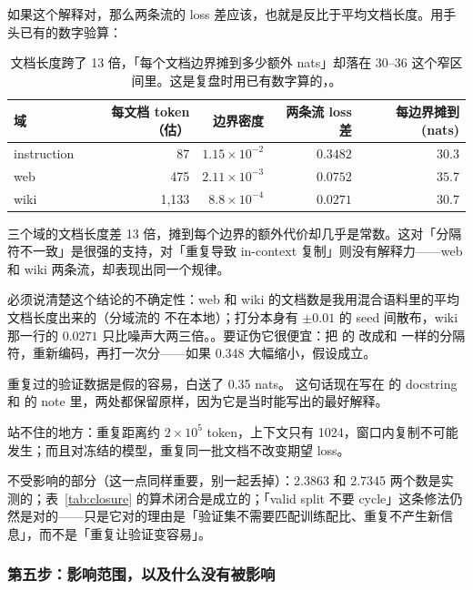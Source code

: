 如果这个解释对，那么两条流的 loss 差应该，也就是反比于平均文档长度。用手头已有的数字验算：

\begin{table}[t]
\centering
\begin{tabular}{lrrrr}
\toprule
域 & 每文档 token（估） & 边界密度 & 两条流 loss 差 & 每边界摊到 (nats) \\
\midrule
instruction & 87      & $1.15\times10^{-2}$ & $0.3482$ & $30.3$ \\
web         & 475     & $2.11\times10^{-3}$ & $0.0752$ & $35.7$ \\
wiki        & 1{,}133 & $8.8\times10^{-4}$  & $0.0271$ & $30.7$ \\
\bottomrule
\end{tabular}
\caption{文档长度跨了 13 倍，「每个文档边界摊到多少额外 nats」却落在 30--36 这个窄区间里。这是复盘时用已有数字算的，。}
\label{tab:boundary-cost}
\end{table}

三个域的文档长度差 13 倍，摊到每个边界的额外代价却几乎是常数。这对「分隔符不一致」是很强的支持，对「重复导致 in-context 复制」则没有解释力——web 和 wiki 两条流，却表现出同一个规律。

必须说清楚这个结论的不确定性：web 和 wiki 的文档数是我用混合语料里的平均文档长度出来的（分域流的  不在本地）；打分本身有 $\pm0.01$ 的 seed 间散布，wiki 那一行的 $0.0271$ 只比噪声大两三倍。。要证伪它很便宜：把  的  改成和  一样的分隔符，重新编码，再打一次分——如果 0.348 大幅缩小，假设成立。

\begin{retraction}{重复过的验证数据是假的容易，白送了 0.35 nats。}
这句话现在写在  的 docstring 和  的 note 里，两处都保留原样，因为它是当时能写出的最好解释。

站不住的地方：重复距离约 $2\times10^{5}$ token，上下文只有 1024，窗口内复制不可能发生；而且对冻结的模型，重复同一批文档不改变期望 loss。

不受影响的部分（这一点同样重要，别一起丢掉）：2.3863 和 2.7345 两个数是实测的；表~\ref{tab:closure} 的算术闭合是成立的；「valid split 不要 cycle」这条修法仍然是对的——只是它对的理由是「验证集不需要匹配训练配比、重复不产生新信息」，而不是「重复让验证变容易」。
\end{retraction}

\subsubsection*{第五步：影响范围，以及什么没有被影响}

